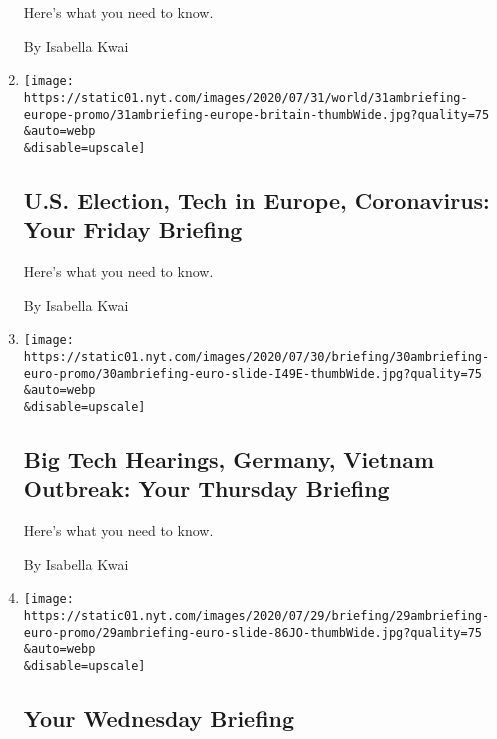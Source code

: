 \begin{enumerate}
  Here's what you need to know.

  By Isabella Kwai
\item
  \href{/2020/07/31/briefing/american-election-tech-europe-coronavirus.html}{}

  \texttt{[image: https://static01.nyt.com/images/2020/07/31/world/31ambriefing-europe-promo/31ambriefing-europe-britain-thumbWide.jpg?quality=75\\\&auto=webp\\\&disable=upscale]}

  \hypertarget{us-election-tech-in-europe-coronavirus-your-friday-briefing}{%
  \subsection{U.S. Election, Tech in Europe, Coronavirus: Your Friday
  Briefing}\label{us-election-tech-in-europe-coronavirus-your-friday-briefing}}

  Here's what you need to know.

  By Isabella Kwai
\item
  \href{/2020/07/30/briefing/big-tech-hearings-germany-vietnam-outbreak.html}{}

  \texttt{[image: https://static01.nyt.com/images/2020/07/30/briefing/30ambriefing-euro-promo/30ambriefing-euro-slide-I49E-thumbWide.jpg?quality=75\\\&auto=webp\\\&disable=upscale]}

  \hypertarget{big-tech-hearings-germany-vietnam-outbreak-your-thursday-briefing}{%
  \subsection{Big Tech Hearings, Germany, Vietnam Outbreak: Your
  Thursday
  Briefing}\label{big-tech-hearings-germany-vietnam-outbreak-your-thursday-briefing}}

  Here's what you need to know.

  By Isabella Kwai
\item
  \href{/2020/07/29/briefing/russian-propaganda-uk-quarantine-van-gogh.html}{}

  \texttt{[image: https://static01.nyt.com/images/2020/07/29/briefing/29ambriefing-euro-promo/29ambriefing-euro-slide-86JO-thumbWide.jpg?quality=75\\\&auto=webp\\\&disable=upscale]}

  \hypertarget{your-wednesday-briefing}{%
  \subsection{Your Wednesday Briefing}\label{your-wednesday-briefing}}


\end{enumerate}
